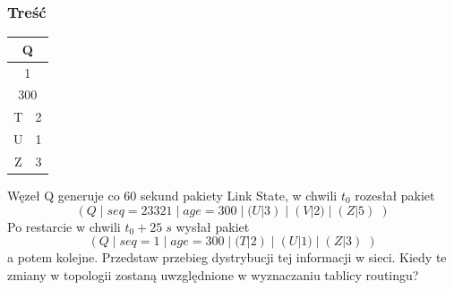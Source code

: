 \documentclass[a4paper,twoside]{article}
\begin{document}
\subsubsection{Treść}
\begin{table}
	\begin{tabular}{|c|c|}
		\hline \multicolumn{2}{|c|}{Q}  \\ 
		\hline \multicolumn{2}{|c|}{1}  \\ 
		\hline \multicolumn{2}{|c|}{300}  \\ 
		\hline T & 2 \\ 
		\hline U & 1 \\ 
		\hline Z & 3 \\ 
		\hline 
	\end{tabular}
\end{table}
Węzeł Q generuje co 60 sekund pakiety Link State, w chwili $ t_0 $ rozesłał pakiet
$$ (Q\;|\;seq=23321\;|\;age=300\;|\;(U|3)\;|\;(V|2)\;|\;(Z|5)\;) $$
Po restarcie w chwili $ t_0+25\;s $ wysłał pakiet
$$ (Q\;|\;seq=1\;|\;age=300\;|\;(T|2)\;|\;(U|1)\;|\;(Z|3)\;) $$
a potem kolejne. Przedstaw przebieg dystrybucji tej informacji w sieci. Kiedy te zmiany w topologii zostaną uwzględnione w wyznaczaniu tablicy routingu?
\end{document}
